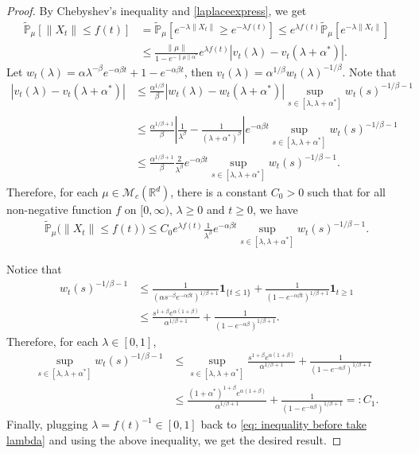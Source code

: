 \documentclass[12pt]{amsart}
\theoremstyle{plain}
\theoremstyle{definition}
\numberwithin{equation}{section}
\begin{document}
\begin{proof}
By Chebyshev's inequality and \eqref{laplaceexpress}, we get
\begin{align*}
    \mathbb{\tilde{P}}_{\mu}[\|X_t\|\leq f(t)]&=\mathbb{\tilde{P}}_{\mu}[e^{-\lambda\|X_t\|}\geq e^{-\lambda f(t)}]\leq e^{\lambda f(t)}\mathbb{\tilde{P}}_{\mu}[e^{-\lambda \|X_t\|}]\\
    &\leq \frac{\|\mu\|}{1-e^{-\|\mu\|\alpha^*}}e^{\lambda f(t)}\left|v_t(\lambda)-v_t(\lambda+\alpha^*)\right|.
\end{align*}
	Let $w_t(\lambda)=\alpha \lambda^{-\beta}e^{-\alpha \beta t}+1-e^{-\alpha\beta t}$, then $v_t(\lambda)=\alpha^{1/\beta}w_t(\lambda)^{-1/\beta}$.
Note that
\begin{align*}
    \left|v_t(\lambda)-v_t(\lambda+\alpha^*)\right|&\leq\frac {\alpha^{1/\beta}}{\beta} \left|w_t(\lambda)-w_t(\lambda+\alpha^*)\right| \sup_{s\in [\lambda,\lambda+\alpha^*]}w_t(s)^{-1/\beta-1}\\
    &\leq  \frac{\alpha^{1/\beta+1}}{\beta}\left|\frac{1}{\lambda^{\beta}}-\frac{1}{(\lambda+\alpha^*)^{\beta}}\right|e^{-\alpha\beta t} \sup_{s\in [\lambda,\lambda+\alpha^*]}w_t(s)^{-1/\beta-1}\\
    &\leq  \frac{\alpha^{1/\beta+1}}{\beta}\frac{2}{\lambda^{\beta}}e^{-\alpha\beta t} \sup_{s\in [\lambda,\lambda+\alpha^*]}w_t(s)^{-1/\beta-1}.
\end{align*}
Therefore, for each $\mu\in \mathcal M_c(\mathbb R^d)$, there is a constant $C_0>0$ such that for all non-negative function $f$ on $[0,\infty)$, $\lambda \geq 0$ and $t\geq 0$, we have
\begin{align}
\label{eq: inequality before take lambda}
    \mathbb{\tilde{P}}_{\mu}\big(\|X_t\|\leq f(t)\big)
    \leq C_0e^{\lambda f(t)}\frac{1}{\lambda^{\beta}}e^{-\alpha\beta t} \sup_{s\in [\lambda,\lambda+\alpha^*]}w_t(s)^{-1/\beta-1}.
\end{align}

Notice that
\begin{align*}
    w_t(s)^{-1/\beta-1}&\leq \frac{1}{(\alpha s^{-\beta}e^{-\alpha \beta t})^{1/
    \beta+1}}\mathbf{1}_{\{t\leq 1\}}+\frac{1}{(1-e^{-\alpha\beta t})^{1/\beta+1}}\mathbf{1}_{t\geq 1}\\
    &\leq \frac{s^{1+\beta}e^{\alpha(1+\beta)}}{\alpha^{1/\beta +1}}+\frac{1}{(1-e^{-\alpha\beta })^{1/\beta+1}}.
\end{align*}
Therefore, for each $\lambda \in [0,1]$,
\begin{align*}
    \sup_{s\in [\lambda,\lambda+\alpha^*]}w_t(s)^{-1/\beta-1}
    &\leq\sup_{s\in [\lambda,\lambda+\alpha^*]}\frac{s^{1+\beta}e^{\alpha(1+\beta)}}{\alpha^{1/\beta +1}}+\frac{1}{(1-e^{-\alpha\beta })^{1/\beta+1}}\\
    &\leq \frac{(1+\alpha^*)^{1+\beta}e^{\alpha(1+\beta)}}{\alpha^{1/\beta+1}}+\frac{1}{(1-e^{-\alpha\beta })^{1/\beta+1}} =: C_1.
\end{align*}
Finally, plugging $\lambda = f(t)^{-1} \in [0,1]$ back to \eqref{eq: inequality before take lambda} and using the above inequality, we get the desired result.
\end{proof}
\end{document}
